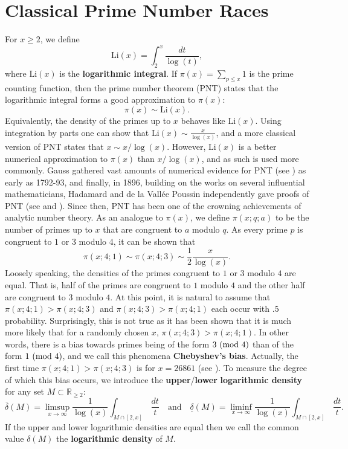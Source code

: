 \documentclass[12pt,reqno]{amsart}
\theoremstyle{definition}
\numberwithin{equation}{section}
\renewcommand{\mod}[1]{{\ifmmode\text{\rm\ (mod~$#1$)}\else\discretionary{}{}{\hbox{ }}\rm(mod~$#1$)\fi}}
\newcommand{\R}{{\mathbb R}}
\begin{document}
\section{Classical Prime Number Races}
    For $x \ge 2$, we define
    \[
        \mathrm{Li}(x) = \int_{2}^{x}\frac{dt}{\log(t)},
    \]
    where $\mathrm{Li}(x)$ is the \textbf{logarithmic integral}. If $\pi(x) = \sum_{p \le x}1$ is the prime counting function, then the prime number theorem (PNT) states that   the logarithmic integral forms a good approximation to $ \pi(x)$:
    \begin{equation}\label{equ:classical_PNT}
        \pi(x) \sim \mathrm{Li}(x).
    \end{equation}
    Equivalently, the density of the primes up to $x$ behaves like $\mathrm{Li}(x)$. Using integration by parts one can show that $\mathrm{Li}(x) \sim \frac{x}{\log(x)}$, and a more classical version of PNT states that $x \sim x/\log(x)$. However, $\mathrm{Li}(x)$ is a better numerical approximation to $\pi(x)$ than $x/\log(x)$, and as such is used more commonly. Gauss gathered vast amounts of numerical evidence for PNT (see \cite{G}) as early as 1792-93, and finally, in 1896, building on the works on several influential mathematicians, Hadamard and de la Vall\'ee Poussin independently gave proofs of PNT (see \cite{H} and \cite{P}). Since then, PNT  has been one of the crowning achievements of analytic number theory. As an analogue to $\pi(x)$, we define $\pi(x;q;a)$ to be the number of primes up to $x$ that are congruent to $a$ modulo $q$. As every prime $p$ is congruent to $1$ or $3$ modulo $4$, it can be shown that
    \[
        \pi(x;4;1) \sim \pi(x;4;3) \sim \frac{1}{2}\frac{x}{\log(x)}.
    \]
    Loosely speaking, the densities of the primes congruent to $1$ or $3$ modulo $4$ are equal. That is, half of the primes are congruent to $1$ modulo $4$ and the other half are congruent to $3$ modulo $4$. At this point, it is natural to assume that  $\pi(x;4;1) > \pi(x;4;3)$ and $\pi(x;4;3) > \pi(x;4;1)$ each occur with $.5$ probability. Surprisingly, this is not true as it has been shown that it is much more likely that for a randomly chosen $x$, $\pi(x;4;3) > \pi(x;4;1)$. In other words, there is a bias towards primes being of the form $3 \mod{4}$ than of the form $1 \mod{4}$, and we call this phenomena \textbf{Chebyshev's bias}. Actually, the first time $\pi(x;4;1) > \pi(x;4;3)$ is for $x = 26861$ (see \cite{GM}). To measure the degree of which this bias occurs, we introduce the \textbf{upper}/\textbf{lower} \textbf{logarithmic density} for any set $M \subset \R_{\ge 2}$:
    \[
        \overline{\delta}(M) = \limsup_{x \to \infty}\frac{1}{\log(x)}\int_{M \cap [2,x]}\,\frac{dt}{t} \quad \text{and} \quad \underline{\delta}(M) = \liminf_{x \to \infty}\frac{1}{\log(x)}\int_{M \cap [2,x]}\,\frac{dt}{t}.
    \]
    If the upper and lower logarithmic densities are equal then we call the common value $\delta(M)$ the \textbf{logarithmic density} of $M$.
    
\end{document}
